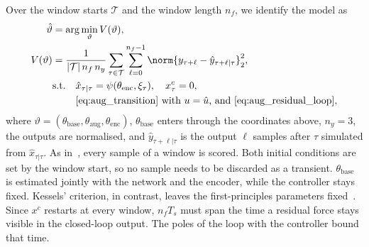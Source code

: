 Over the window starts $\mathcal T$ and the window length $n_f$, we identify
the model as
\begin{equation}
\begin{aligned}
 \hat\vartheta&=\arg\min_{\vartheta}V(\vartheta),\\
 V(\vartheta)&=\frac{1}{|\mathcal T|\,n_f\,n_y}
 \sum_{\tau\in\mathcal T}\sum_{\ell=0}^{n_f-1}
 \norm{y_{\tau+\ell}-\hat y_{\tau+\ell|\tau}}_2^2,\\
 &\text{s.t.}\quad \hat x_{\tau|\tau}=\psi(\theta_{\mathrm{enc}},\xi_\tau),\quad x^c_\tau=0,\\
 &\phantom{\text{s.t.}\quad}\text{\eqref{eq:aug_transition} with $u=\hat u$, and \eqref{eq:aug_residual_loop}},
\end{aligned}
\label{eq:aug_loss}
\end{equation}
where $\vartheta=(\theta_{\mathrm{base}},\theta_{\mathrm{aug}},\theta_{\mathrm{enc}})$,
$\theta_{\mathrm{base}}$ enters through the coordinates above, $n_y=3$, the
outputs are normalised, and $\hat y_{\tau+\ell|\tau}$ is the output $\ell$
samples after $\tau$ simulated from $\hat x_{\tau|\tau}$.
As in~\cite[Eq.~(22)]{hoekstra2026lfr}, every sample of a window is scored.
Both initial conditions are set by the window start, so no sample needs to be
discarded as a transient.
$\theta_{\mathrm{base}}$ is estimated jointly with the network and the
encoder, while the controller stays fixed.
Kessels' criterion, in contrast, leaves the first-principles parameters
fixed~\cite[Eq.~(5.12)]{kessels2025ai}.
Since $x^c$ restarts at every window, $n_fT_s$ must span the time a residual
force stays visible in the closed-loop output.
The poles of the loop with the controller bound that time.

